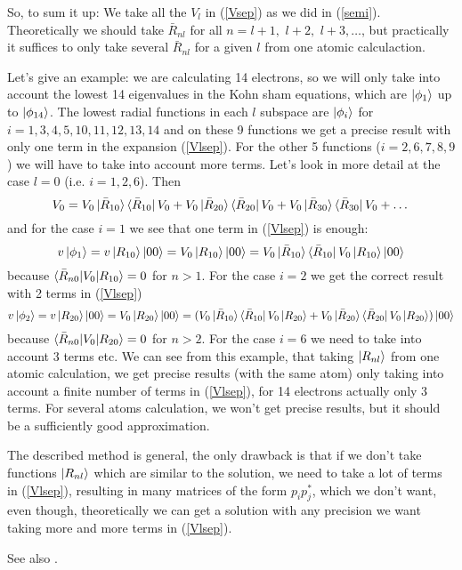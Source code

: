 So, to sum it up: We take all the $V_l$ in (\ref{Vsep}) as we did in (\ref{semi}). Theoretically we should take $\bar R_{nl}$ for all $n=l+1,\,\, l+2,\,\,l+3,\dots$, but practically it suffices to only take several $\bar R_{nl}$ for a given $l$ from one atomic calculaction.

Let's give an example: we are calculating 14 electrons, so we will only take into account the lowest 14 eigenvalues in the Kohn sham equations, which are $\mathinner{|{\phi_1}\rangle}$ up to $\mathinner{|{\phi_{14}}\rangle}$. The lowest radial functions in each $l$ subspace are $\mathinner{|{\phi_i}\rangle}$ for $i=1,3,4,5,10,11,12,13,14$ and on these 9 functions we get a precise result with only one term in the expansion (\ref{Vlsep}). For the other 5 functions ($i=2,6,7,8,9$) we will have to take into account more terms. Let's look in more detail at the case $l=0$ (i.e. $i=1,2,6$). Then 
\begin{equation*}
  V_0= V_0\mathinner{|{\bar R_{10}}\rangle}\mathinner{\langle{\bar R_{10}}|}V_0+ V_0\mathinner{|{\bar R_{20}}\rangle}\mathinner{\langle{\bar R_{20}}|}V_0+ V_0\mathinner{|{\bar R_{30}}\rangle}\mathinner{\langle{\bar R_{30}}|}V_0+ \dots
\end{equation*}
and for the case $i=1$ we see that one term in (\ref{Vlsep}) is enough: 
\begin{equation*}
  v\mathinner{|{\phi_1}\rangle}=v\mathinner{|{R_{10}}\rangle}\mathinner{|{00}\rangle}=V_0\mathinner{|{R_{10}}\rangle}\mathinner{|{00}\rangle}= V_0\mathinner{|{\bar R_{10}}\rangle}\mathinner{\langle{\bar R_{10}}|}V_0\mathinner{|{R_{10}}\rangle}\mathinner{|{00}\rangle}
\end{equation*}
because $\mathinner{\langle{\bar R_{n0}|V_0|R_{10}}\rangle}=0$ for $n>1$. For the case $i=2$ we get the correct result with 2 terms in (\ref{Vlsep})
\begin{equation*}
  v\mathinner{|{\phi_2}\rangle}=v\mathinner{|{R_{20}}\rangle}\mathinner{|{00}\rangle}=V_0\mathinner{|{R_{20}}\rangle}\mathinner{|{00}\rangle}=( V_0\mathinner{|{\bar R_{10}}\rangle}\mathinner{\langle{\bar R_{10}}|}V_0\mathinner{|{R_{20}}\rangle}+ V_0\mathinner{|{\bar R_{20}}\rangle}\mathinner{\langle{\bar R_{20}}|}V_0\mathinner{|{R_{20}}\rangle} )\mathinner{|{00}\rangle}
\end{equation*}
because $\mathinner{\langle{\bar R_{n0}|V_0|R_{20}}\rangle}=0$ for $n>2$. For the case $i=6$ we need to take into account 3 terms etc. We can see from this example, that taking $\mathinner{|{R_{nl}}\rangle}$ from one atomic calculation, we get precise results (with the same atom) only taking into account a finite number of terms in (\ref{Vlsep}), for 14 electrons actually only 3 terms. For several atoms calculation, we won't get precise results, but it should be a sufficiently good approximation.

The described method is general, the only drawback is that if we don't take functions $\mathinner{|{R_{nl}}\rangle}$ which are similar to the solution, we need to take a lot of terms in (\ref{Vlsep}), resulting in many matrices of the form $p_ip_j^*$, which we don't want, even though, theoretically we can get a solution with any precision we want taking more and more terms in (\ref{Vlsep}).

See also \cite{blochl}.
